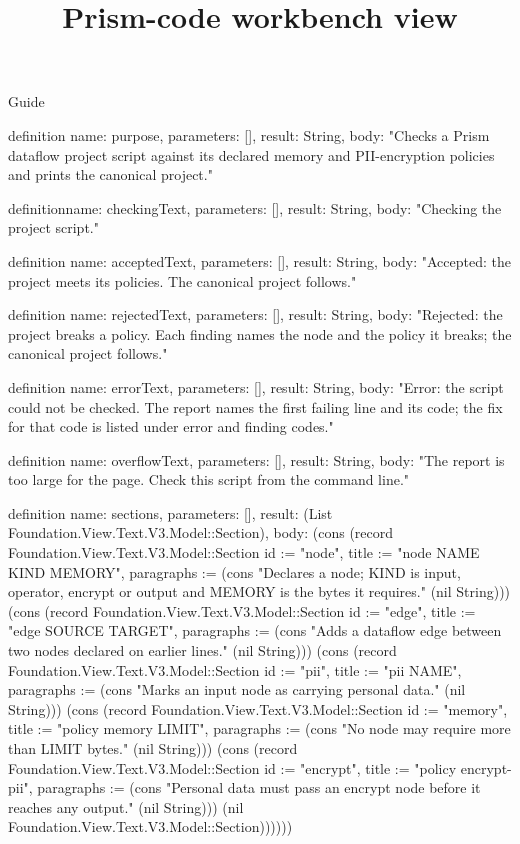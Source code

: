 \begin{lexlean}{Guide}
\title{Prism-code workbench view}
\begin{semanticmodule}
definition{
  name: purpose,
  parameters: [],
  result: String,
  body: "Checks a Prism dataflow project script against its declared memory and PII-encryption policies and prints the canonical project."
}

definition{name: checkingText, parameters: [], result: String, body: "Checking the project script."}

definition{
  name: acceptedText,
  parameters: [],
  result: String,
  body: "Accepted: the project meets its policies. The canonical project follows."
}

definition{
  name: rejectedText,
  parameters: [],
  result: String,
  body: "Rejected: the project breaks a policy. Each finding names the node and the policy it breaks; the canonical project follows."
}

definition{
  name: errorText,
  parameters: [],
  result: String,
  body: "Error: the script could not be checked. The report names the first failing line and its code; the fix for that code is listed under error and finding codes."
}

definition{
  name: overflowText,
  parameters: [],
  result: String,
  body: "The report is too large for the page. Check this script from the command line."
}

definition{
  name: sections,
  parameters: [],
  result: (List Foundation.View.Text.V3.Model::Section),
  body: (cons (record Foundation.View.Text.V3.Model::Section {id := "node", title := "node NAME KIND MEMORY", paragraphs := (cons "Declares a node; KIND is input, operator, encrypt or output and MEMORY is the bytes it requires." (nil String))}) (cons (record Foundation.View.Text.V3.Model::Section {id := "edge", title := "edge SOURCE TARGET", paragraphs := (cons "Adds a dataflow edge between two nodes declared on earlier lines." (nil String))}) (cons (record Foundation.View.Text.V3.Model::Section {id := "pii", title := "pii NAME", paragraphs := (cons "Marks an input node as carrying personal data." (nil String))}) (cons (record Foundation.View.Text.V3.Model::Section {id := "memory", title := "policy memory LIMIT", paragraphs := (cons "No node may require more than LIMIT bytes." (nil String))}) (cons (record Foundation.View.Text.V3.Model::Section {id := "encrypt", title := "policy encrypt-pii", paragraphs := (cons "Personal data must pass an encrypt node before it reaches any output." (nil String))}) (nil Foundation.View.Text.V3.Model::Section))))))
}


\end{semanticmodule}
\end{lexlean}
